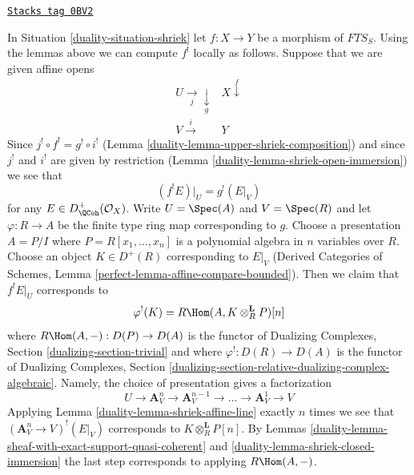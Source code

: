 \begin{remark}

\label{duality-remark-local-calculation-shriek}
\href{https://stacks.math.columbia.edu/tag/0BV2}{\texttt{Stacks tag 0BV2}}

In Situation \ref{duality-situation-shriek} let $f : X \to Y$ be a morphism of
$\textit{FTS}_S$. Using the lemmas above we can compute
$f^!$ locally as follows. Suppose that we are given affine opens
$$
\begin{array}{cc}U \underset{j}{\longrightarrow}\underset{g}{\downarrow} & X \overset{f}{\downarrow} \\ V \overset{i}{\longrightarrow} & Y\end{array}
$$
Since $j^! \circ f^! = g^! \circ i^!$
(Lemma \ref{duality-lemma-upper-shriek-composition})
and since $j^!$ and $i^!$ are given by restriction
(Lemma \ref{duality-lemma-shriek-open-immersion})
we see that
$$
(f^!E)|_U = g^!(E|_V)
$$
for any $E \in D^+_\QCoh(\mathcal{O}_X)$. Write
$U = \Spec(A)$ and $V = \Spec(R)$ and let $\varphi : R \to A$
be the finite type ring map corresponding to $g$.
Choose a presentation $A = P/I$ where $P = R[x_1, \ldots, x_n]$
is a polynomial algebra in $n$ variables over $R$. Choose an
object $K \in D^+(R)$ corresponding to $E|_V$
(Derived Categories of Schemes, Lemma
\ref{perfect-lemma-affine-compare-bounded}).
Then we claim that $f^!E|_U$ corresponds to
$$
\varphi^!(K) = R\Hom(A, K \otimes_R^\mathbf{L} P)[n]
$$
where $R\Hom(A, -) : D(P) \to D(A)$ is the functor of
Dualizing Complexes, Section \ref{dualizing-section-trivial}
and where $\varphi^! : D(R) \to D(A)$ is the functor of
Dualizing Complexes, Section
\ref{dualizing-section-relative-dualizing-complex-algebraic}.
Namely, the choice of presentation
gives a factorization
$$
U \rightarrow \mathbf{A}^n_V \to \mathbf{A}^{n - 1}_V \to \ldots \to
\mathbf{A}^1_V \to V
$$
Applying Lemma \ref{duality-lemma-shriek-affine-line} exactly $n$ times we see that
$(\mathbf{A}^n_V \to V)^!(E|_V)$ corresponds to
$K \otimes_R^\mathbf{L} P[n]$. By Lemmas
\ref{duality-lemma-sheaf-with-exact-support-quasi-coherent} and
\ref{duality-lemma-shriek-closed-immersion} the last step corresponds to
applying $R\Hom(A, -)$.
\end{remark}

